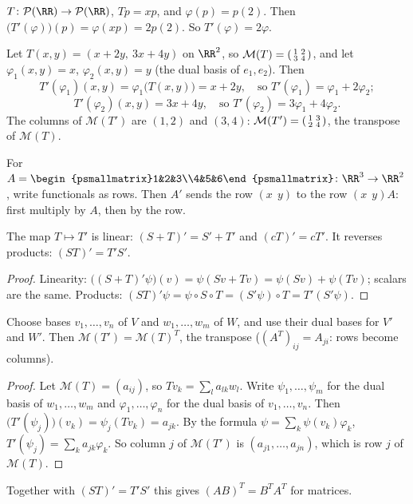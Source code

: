 \documentclass[10pt]{scrartcl}
\newcommand{\PP}{\mathcal P}
\newcommand{\MM}{\mathcal M}
\begin{document}
\begin{example*}[Ex.~45]
  $T\colon\PP(\RR)\to\PP(\RR)$, $Tp=xp$, and $\varphi(p)=p(2)$. Then $\big(T'(\varphi)\big)(p)=\varphi(xp)=2p(2)$. So $T'(\varphi)=2\varphi$.
\end{example*}

\begin{example*}
  Let $T(x,y)=(x+2y,\ 3x+4y)$ on $\RR^2$, so $\MM(T)=\begin{psmallmatrix}1&2\\3&4\end{psmallmatrix}$, and let $\varphi_1(x,y)=x$, $\varphi_2(x,y)=y$ (the dual basis of $e_1,e_2$). Then
  \[ T'(\varphi_1)(x,y)=\varphi_1\big(T(x,y)\big)=x+2y,\quad\text{so }T'(\varphi_1)=\varphi_1+2\varphi_2; \]
  \[ T'(\varphi_2)(x,y)=3x+4y,\quad\text{so }T'(\varphi_2)=3\varphi_1+4\varphi_2. \]
  The columns of $\MM(T')$ are $(1,2)$ and $(3,4)$: $\MM(T')=\begin{psmallmatrix}1&3\\2&4\end{psmallmatrix}$, the transpose of $\MM(T)$.
\end{example*}

\begin{example*}[Ex.~46]
  For $A=\begin{psmallmatrix}1&2&3\\4&5&6\end{psmallmatrix}\colon\RR^3\to\RR^2$, write functionals as rows. Then $A'$ sends the row $(x\ \ y)$ to the row $(x\ \ y)A$: first multiply by $A$, then by the row.
\end{example*}

\begin{proposition*}
  The map $T\mapsto T'$ is linear: $(S+T)'=S'+T'$ and $(cT)'=cT'$. It reverses products: $(ST)'=T'S'$.
\end{proposition*}
\begin{proof}
  Linearity: $\big((S+T)'\psi\big)(v)=\psi(Sv+Tv)=\psi(Sv)+\psi(Tv)$; scalars are the same. Products: $(ST)'\psi=\psi\circ S\circ T=(S'\psi)\circ T=T'(S'\psi)$.
\end{proof}

\begin{proposition*}
  Choose bases $v_1,\dots,v_n$ of $V$ and $w_1,\dots,w_m$ of $W$, and use their dual bases for $V'$ and $W'$. Then $\MM(T')=\MM(T)^T$, the transpose ($(A^T)_{ij}=A_{ji}$: rows become columns).
\end{proposition*}
\begin{proof}
  Let $\MM(T)=(a_{ij})$, so $Tv_k=\sum_la_{lk}w_l$. Write $\psi_1,\dots,\psi_m$ for the dual basis of $w_1,\dots,w_m$ and $\varphi_1,\dots,\varphi_n$ for the dual basis of $v_1,\dots,v_n$. Then $\big(T'(\psi_j)\big)(v_k)=\psi_j(Tv_k)=a_{jk}$. By the formula $\psi=\sum_k\psi(v_k)\varphi_k$, $T'(\psi_j)=\sum_ka_{jk}\varphi_k$. So column $j$ of $\MM(T')$ is $(a_{j1},\dots,a_{jn})$, which is row $j$ of $\MM(T)$.
\end{proof}
Together with $(ST)'=T'S'$ this gives $(AB)^T=B^TA^T$ for matrices.
\end{document}
